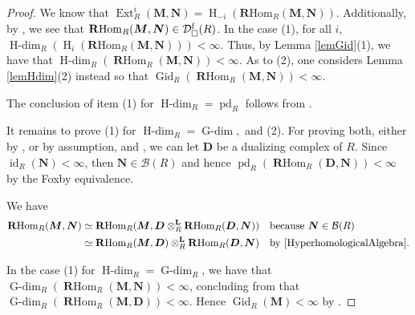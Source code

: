 \documentclass[11pt, a4paper,pagebackref]{amsart}
\numberwithin{equation}{section}
\theoremstyle{definition}
\newtheorem{remark and definition}[theorem]{Remark and Definition}
\newtheorem{remark and notation}[theorem]{Remark and Notation}
\newcommand\Ext{\operatorname{Ext}}
\newcommand\RHom{\operatorname{\mathbf{R}Hom}}
\begin{document}
\begin{proof}
    We know that $\Ext_R^i(\boldsymbol{M},\boldsymbol{N})=\operatorname{H}_{-i}(\mathbf{R}\mathrm{Hom}_R(\boldsymbol{M},\boldsymbol{N}))$. Additionally, by \cite[A.4.4 and A.5.2]{GorensteinDimensions}, we see that $\RHom_R(\boldsymbol{M},\boldsymbol{N}) \in \mathcal{D}_{\square}^{\rm f}(R)$. In the case (1), for all $i$, $\operatorname{H-dim}_R(\operatorname{H}_i(\mathbf{R}\mathrm{Hom}_R(\boldsymbol{M},\boldsymbol{N})))<\infty$.  Thus,  by Lemma \ref{lemGid}(1), we have that $\operatorname{H-dim}_R(\RHom_R(\boldsymbol{M}, \boldsymbol{N}))<\infty$. As to (2), one considers Lemma \ref{lemHdim}(2) instead so that $\operatorname{Gid}_R(\RHom_R(\boldsymbol{M}, \boldsymbol{N}))<\infty$.
     
The conclusion of item (1) for 
$\operatorname{H-dim}_R=\operatorname{pd}_R$ follows from \cite[Lemma 6.2.12]{HyperhomologicalAlgebra}.  

It remains to prove  (1) for $\operatorname{H-dim}_R=\operatorname{G-dim},$ and (2).  For proving both, either by \cite[2.4]{GdimensionOverLocalHomomorphisms}, or by assumption, \cite[Proposition 5.9]{Semi-dualizingComplexesAndTheirAuslanderCategores} and \cite[Theorem 19.2.34]{DerivedCategoryMethodsInCommutativeAlgebra}, we can let $\boldsymbol{D}$ be a dualizing complex of $R$. Since $\operatorname{id}_R(\boldsymbol{N})<\infty$, then $\boldsymbol{N} \in \mathcal{B}(R)$  and hence  $\operatorname{pd}_R(\RHom_R(\boldsymbol{D},\boldsymbol{N}))<\infty$ by the Foxby equivalence. 
    
 We have
    \begin{align*}
   \RHom_R(\boldsymbol{M},\boldsymbol{N})& \simeq \RHom_R(\boldsymbol{M}, \boldsymbol{D} \otimes_R^{\mathbf{L}} \RHom_R(\boldsymbol{D}, \boldsymbol{N})) && \text{because } \boldsymbol{N} \in \mathcal{B}(R)\\ & \simeq  \RHom_R(\boldsymbol{M}, \boldsymbol{D}) \otimes_R^{\mathbf{L}} \RHom_R(\boldsymbol{D},\boldsymbol{N})&& \text{by  \cite[Theorem 4.4.5(a)]{HyperhomologicalAlgebra}}.
\end{align*}

In the case (1) for $\operatorname{H-dim}_R=\operatorname{G-dim}_R$, we have that $\operatorname{G-dim}_R(\RHom_R(\boldsymbol{M},\boldsymbol{N}))<\infty$, concluding from \cite[Theorems 5.1]{GdimensionOverLocalHomomorphisms} that $\operatorname{G-dim}_R(\RHom_R(\boldsymbol{M},\boldsymbol{D}))<\infty$. Hence $\operatorname{Gid}_R(\boldsymbol{M})<\infty$  by \cite[Corollary 6.4]{OnGorensteinProjectiveInjectiveAndFlatDimensionsAFunctorialDescriptionWithApplications}.


\end{proof}
\end{document}
